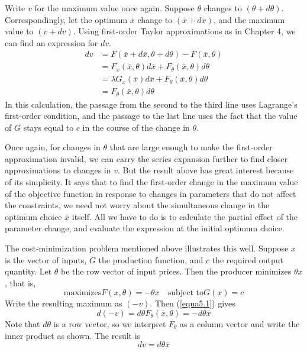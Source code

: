 Write $v$ for the maximum value once again. Suppose $\theta$ changes to $(\theta + d\theta)$. Correspondingly, let the optimum $\bar{x}$ change to $(\bar{x} +d\bar{x} )$, and the maximum value to $(v +dv)$. Using first-order Taylor approximations as in Chapter 4, we can find an expression for $dv$.
\begin{equation} \label{equa5.1}
\begin{array}{rl}
dv & = F(\bar{x} + d\bar{x}, \theta+d\theta) - F(\bar{x}, \theta) \\
   & = F_x(\bar{x}, \theta) d\bar{x} + F_\theta(\bar{x}, \theta) d\theta \\
   & = \lambda G_x(\bar{x}) d\bar{x} + F_\theta(\bar{x}, \theta) d\theta \\
   & = F_\theta(\bar{x}, \theta) d\theta
\end{array}
\end{equation}
In this calculation, the passage from the second to the third line uses Lagrange's first-order condition, and the passage to the last line uses the fact that the value of $G$ stays equal to $c$ in the course of the change in $\theta$.

Once again, for changes in $\theta$ that are large enough to make the first-order approximation invalid, we can carry the series expansion further to find closer approximations to changes in $v$. But the result above has great interest because of its simplicity. It says that to find the first-order change in the maximum value of the objective function in response to changes in parameters that do not affect the constraints, we need not worry about the simultaneous change in the optimum choice $\bar{x}$ itself. All we have to do is to calculate the partial effect of the parameter change, and evaluate the expression at the initial optimum choice.

The cost-minimization problem mentioned above illustrates this well. Suppose $x$ is the vector of inputs, $G$ the production function, and $c$ the required output quantity. Let $\theta$ be the row vector of input prices. Then the producer minimizes $\theta x$, that is,
\begin{equation*}
\mbox{maximizes} F(x,\theta) = -\theta x \quad \mbox{subject to} G(x)=c
\end{equation*}
Write the resulting maximum as $(-v)$. Then (\ref{equa5.1}) gives 
\begin{equation*}
d(-v) =d\theta F_\theta(\bar{x}, \theta) = -d\theta \bar{x}
\end{equation*}
Note that $d\theta$ is a row vector, so we interpret $F_\theta$ as a column vector and write the inner product as shown. The result is 
\begin{equation} \label{equa5.2}
dv = d\theta \bar{x}
\end{equation}

